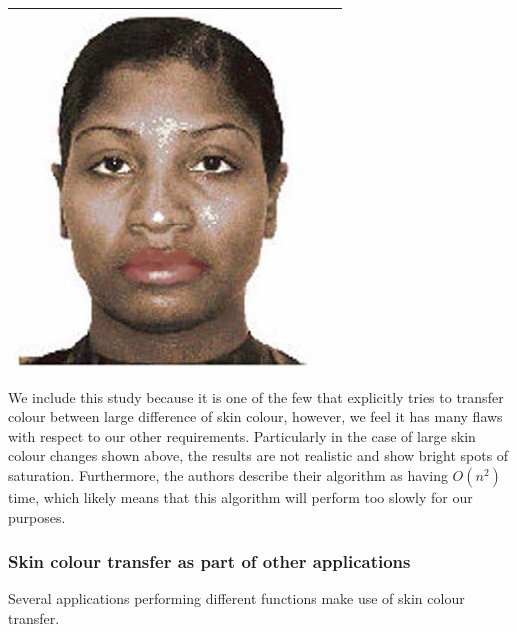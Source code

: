 \begin{table}[H]
\begin{tabular}{|c|c|c|}
\begin{minipage}{.29\textwidth}
    \includegraphics[width=\textwidth,height=\textheight,keepaspectratio]{images/yin_result1}
  \end{minipage} \\
    \hline
\end{tabular}
\end{table}

We include this study because it is one of the few that explicitly tries to transfer colour between large difference of skin colour, however, we feel it has many flaws with respect to our other requirements. Particularly in the case of large skin colour changes shown above, the results are not realistic and show bright spots of saturation. Furthermore, the authors describe their algorithm as having $O(n^2)$ time, which likely means that this algorithm will perform too slowly for our purposes.



\subsubsection{Skin colour transfer as part of other applications}
Several applications performing different functions make use of skin colour transfer.

